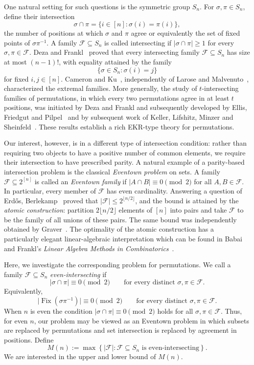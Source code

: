 \documentclass[12pt]{article}
\theoremstyle{definition}
\newcommand{\1}{\mathbf 1}
\newcommand{\Fix}{\operatorname{Fix}}
\begin{document}
One natural setting for such questions is the symmetric group $S_n$. For $\sigma,\pi\in S_n$, define their intersection
\[
\sigma \cap \pi
=
\{i\in[n]:\sigma(i)=\pi(i)\},
\]
the number of positions at which $\sigma$ and $\pi$ agree or equivalently the set of fixed points of $\sigma \pi^{-1}$. A family $\mathcal{F}\subseteq S_n$ is called intersecting if
$|\sigma \cap \pi| \ge 1$ for every $\sigma,\pi \in \mathcal{F}$.
Deza and Frankl~\cite{frankl1977maximum} proved that every intersecting family $\mathcal{F}\subseteq S_n$ has size at most $(n-1)!$, with equality attained by the family
\[
\{\sigma\in S_n:\sigma(i)=j\}
\]
for fixed $i,j\in[n]$. Cameron and Ku~\cite{cameron2003intersecting}, independently of Larose and Malvenuto~\cite{larose2004stable}, characterized the extremal families. More generally, the study of $t$-intersecting families of permutations, in which every two permutations agree in at least $t$ positions, was initiated by Deza and Frankl and subsequently developed by Ellis, Friedgut and Pilpel~\cite{ellis2011intersecting} and by subsequent work of Keller, Lifshitz, Minzer and Sheinfeld~\cite{keller2024t}. These results establish a rich EKR-type theory for permutations.

Our interest, however, is in a different type of intersection condition: rather than requiring two objects to have a positive number of common elements, we require their intersection to have prescribed parity.
A natural example of a parity-based intersection problem is the classical \emph{Eventown problem}  on sets. A family $\mathcal{F}\subseteq 2^{[n]}$ is called an \emph{Eventown family} if $|A\cap B|\equiv0\pmod 2$ for all $A,B\in\mathcal{F}$. In particular, every member of $\mathcal{F}$ has even cardinality. Answering a question of Erd\H{o}s, Berlekamp~\cite{berlekamp1969subsets} proved that $|\mathcal{F}|\leq2^{\lfloor n/2\rfloor}$, and the bound is attained by the \emph{atomic construction}: partition $2\lfloor n/2\rfloor$ elements of $[n]$ into pairs and take $\mathcal{F}$ to be the family of all unions of these pairs. The same bound was independently obtained by Graver~\cite{graver1975boolean}. The optimality of the atomic construction has a particularly elegant linear-algebraic interpretation which can be found in Babai and Frankl's \emph{Linear Algebra Methods in Combinatorics}~\cite{babai1992linear}.

Here, we investigate the corresponding problem for permutations. 
We call a family $\mathcal{F}\subseteq S_n$ \emph{even-intersecting} if
\[
|\sigma \cap \pi|\equiv0\pmod 2
\qquad\text{for every distinct } \sigma,\pi\in\mathcal{F}.
\]
Equivalently,
\[
\big|\Fix(\sigma\pi^{-1})\big|
\equiv0\pmod2
\qquad\text{for every distinct } \sigma,\pi\in\mathcal{F}.
\]
When $n$ is even the condition $|\sigma \cap \pi| \equiv 0\pmod2$ holds for all $\sigma,\pi \in \mathcal{F}$. Thus, for even $n$, our problem may be viewed as an Eventown problem in which subsets are replaced by permutations and set intersection is replaced by agreement in positions.
Define 
$$M(n):=\max\left\{|\mathcal{F}|:\mathcal{F}\subseteq S_n \text{ is even-intersecting}\right\}.$$
We are interested in the upper and lower bound of $M(n)$. 
\end{document}
